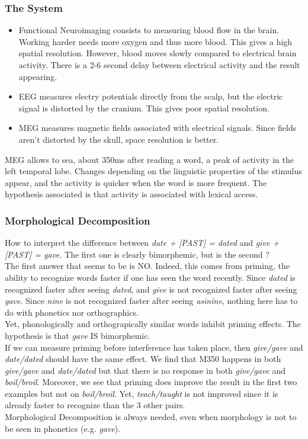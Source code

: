 \documentclass{cours}
\begin{document}
\subsubsection{The System}
\begin{itemize}
    \item Functional Neuroimaging consists to measuring blood flow in the brain. Working harder needs more oxygen and thus more blood. This gives a high spatial resolution. However, blood moves slowly compared to electrical brain activity. There is a 2-6 second delay between electrical activity and the result appearing.
    \item EEG measures electry potentials directly from the scalp, but the electric signal is distorted by the cranium. This gives poor spatial resolution.
    \item MEG measures magnetic fields associated with electrical signals. Since fields aren't distorted by the skull, space resolution is better.
\end{itemize}
MEG allows to sea, about 350ms after reading a word, a peak of activity in the left temporal lobe. Changes depending on the linguistic properties of the stimulus appear, and the activity is quicker when the word is more frequent. The hypothesis associated is that activity is associated with lexical access.

\subsubsection{Morphological Decomposition}
How to interpret the difference between \textsl{date + [PAST] = dated} and \textsl{give + [PAST] = gave}. The first one is clearly bimorphemic, but is the second ? \\
The first answer that seems to be is NO. Indeed, this comes from priming, the ability to recognize words faster if one has seen the word recently. Since \textsl{dated} is recognized faster after seeing \textsl{dated}, and \textsl{give} is not recognized faster after seeing \textsl{gave}. Since \textsl{nine} is not recognized faster after seeing \textsl{asinine}, nothing here has to do with phonetics nor orthographics. \\
Yet, phonologically and orthograpically similar words inhibit priming effects. The hypothesis is that \textsl{gave} IS bimorphemic. \\
If we can measure priming before interference has taken place, then \textsl{give/gave} and \textsl{date/dated} should have the same effect. We find that M350 happens in both \textsl{give/gave} and \textsl{date/dated} but that there is no response in both \textsl{give/gave} and \textsl{boil/broil}. Moreover, we see that priming does improve the result in the first two examples but not on \textsl{boil/broil}. Yet, \textsl{teach/taught} is not improved since it is already faster to recognize than the 3 other pairs. \\
Morphological Decomposition is always needed, even when morphology is not to be seen in phonetics (e.g. \textsl{gave}).
\end{document}
